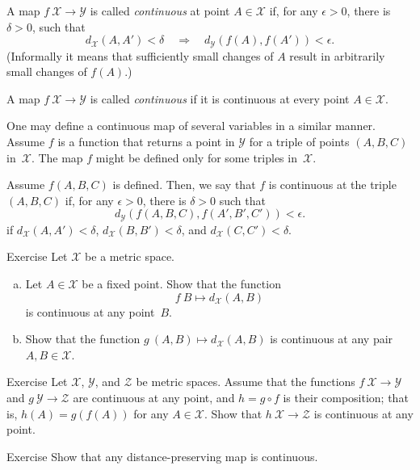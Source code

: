 A map $f\:\mathcal X\to\mathcal Y$ is called \emph{continuous} at point $A\in \mathcal X$
if, for any $\epsilon>0$, there is $\delta>0$, such that 
\[d_{\mathcal X}(A,A')
<
\delta
\quad
\Rightarrow
\quad
d_{\mathcal Y}(f(A),f(A'))
<
\epsilon.\]
(Informally it means that sufficiently small changes of $A$ result in arbitrarily small changes of $f(A)$.)

A map $f\:\mathcal X\to\mathcal Y$ is called \emph{continuous} if it is continuous at every point $A\in \mathcal X$.

One may define a continuous map of several variables in a similar manner.
Assume $f$ is a function that returns a point in $\mathcal Y$ for a triple of points $(A,B,C)$
in~$\mathcal X$.
The map $f$ might be defined only for some triples in~$\mathcal X$.

Assume $f(A,B,C)$ is defined.
Then, we say that $f$ is continuous at the triple $(A,B,C)$ 
if, for any $\epsilon>0$, there is $\delta>0$ such that 
\[d_{\mathcal Y}(f(A,B,C),f(A',B',C'))<\epsilon.\]
if $d_{\mathcal X}(A,A')<\delta$, $d_{\mathcal X}(B,B')<\delta$, and $d_{\mathcal X}(C,C')<\delta$.


\begin{thm}{Exercise}\label{ex:dist-cont}
Let $\mathcal{X}$ be a metric space.
\begin{enumerate}[(a)]
\item\label{ex:dist-cont:a} Let $A\in \mathcal{X}$ be a fixed point.
Show that the function 
$$f\:B\mapsto
d_{\mathcal{X}}(A,B)$$ 
is continuous at any point~$B$.
\item Show that the function $g\:(A,B)\mapsto d_{\mathcal{X}}(A,B)$ is continuous at any pair $A,B\in \mathcal{X}$.
\end{enumerate}

\end{thm}

\begin{thm}{Exercise}\label{ex:comp+cont}
Let $\mathcal{X}$, $\mathcal{Y}$, and $\mathcal{Z}$ be metric spaces.
Assume that the functions $f\:\mathcal{X}\to\mathcal{Y}$
and $g\:\mathcal{Y}\to\mathcal{Z}$ are continuous at any point,
and $h=g\circ f$ is their composition;
that is, $h(A)=g(f(A))$ for any $A\in \mathcal{X}$.
Show that $h\:\mathcal{X}\to\mathcal{Z}$ is continuous at any point.
\end{thm}

\begin{thm}{Exercise}\label{ex:isom-cont}
Show that any distance-preserving map is continuous.
\end{thm}

